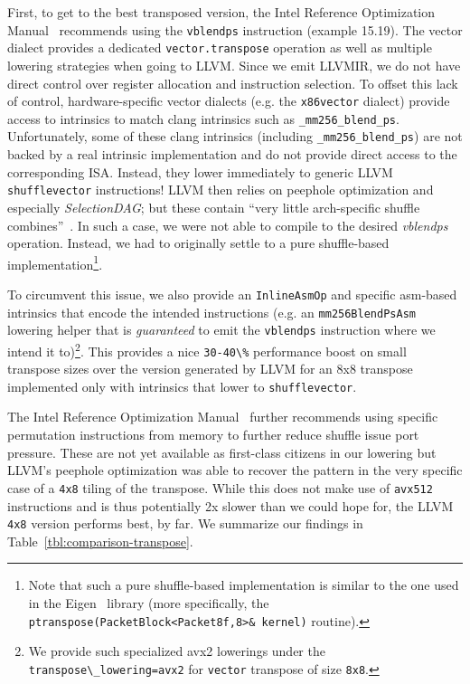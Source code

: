 First, to get to the best transposed version, the Intel Reference Optimization Manual~\cite{IntelOptimizationManual} recommends using the \lstinline|vblendps| instruction (example 15.19).
The vector dialect provides a dedicated \lstinline|vector.transpose| operation as well as multiple lowering strategies when going to LLVM. 
Since we emit LLVMIR, we do not have direct control over register allocation and instruction selection.
To offset this lack of control, hardware-specific vector dialects (e.g. the \lstinline|x86vector| dialect) provide
access to intrinsics to match clang intrinsics such as \lstinline{_mm256_blend_ps}.
Unfortunately, some of these clang intrinsics (including \lstinline{_mm256_blend_ps}) are not backed by a real intrinsic 
implementation and do not provide direct access to the corresponding ISA.
Instead, they lower immediately to generic LLVM \lstinline|shufflevector| instructions!
LLVM then relies on peephole optimization and especially \emph{SelectionDAG}; but these contain ``very little
arch-specific shuffle combines''~\cite{VBlendPsLimitation}.
In such a case, we were not able to compile to the desired \emph{vblendps} operation. 
Instead, we had to originally settle to a pure shuffle-based implementation\footnote{Note that such a pure shuffle-based 
implementation is similar to the one used in the
Eigen~\cite{eigen} library (more specifically, the \lstinline|ptranspose(PacketBlock<Packet8f,8>& kernel)| routine).}.

To circumvent this issue, we also provide an \lstinline{InlineAsmOp} and specific asm-based intrinsics that encode
the intended instructions (e.g. an \lstinline{mm256BlendPsAsm} lowering helper that is \emph{guaranteed} to emit the \lstinline{vblendps} instruction where we intend it to)\footnote{
We provide such specialized avx2 lowerings under the \lstinline|transpose\_lowering=avx2| for \lstinline|vector| transpose
of size \lstinline|8x8|.}.
This provides a nice \lstinline|30-40\%| performance boost on small transpose sizes over the version
generated by LLVM for an 8x8 transpose implemented only with intrinsics that lower to \lstinline|shufflevector|.

The Intel Reference Optimization Manual~\cite{IntelOptimizationManual} further recommends using specific permutation instructions from memory to further reduce shuffle issue port pressure.
These are not yet available as first-class citizens in our lowering but LLVM's peephole optimization was able to recover the
pattern in the very specific case of a \lstinline|4x8| tiling of the transpose.
While this does not make use of \lstinline|avx512| instructions and is thus potentially 2x slower 
than we could hope for, the LLVM  \lstinline|4x8| version performs best, by far.
We summarize our findings in Table~\ref{tbl:comparison-transpose}.

